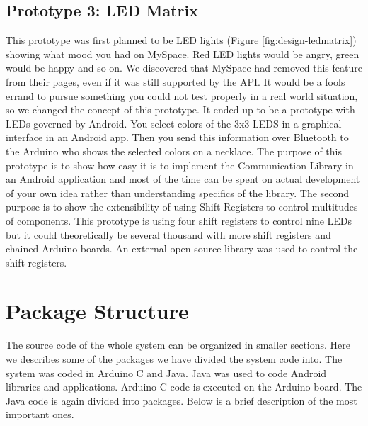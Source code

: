 \subsection{Prototype 3: LED Matrix} \label{section:prototype-led}
This prototype was first planned to be LED lights (Figure \ref{fig:design-ledmatrix}) showing what mood you had on MySpace.
Red LED lights would be angry, green would be happy and so on. We discovered that MySpace had removed this feature from their pages, even if it was still supported by the API. It would be a fools errand to pursue something you could not test properly
in a real world situation, so we changed the concept of this prototype. It ended up to be a prototype with LEDs governed by Android.
You select colors of the 3x3 LEDS in a graphical interface in an Android app. Then you send this information over Bluetooth
to the Arduino who shows the selected colors on a necklace.
The purpose of this prototype is to show how easy it is to implement the Communication Library in an Android application and most of the time can be spent on actual development of your own idea rather than understanding specifics of the library. The second purpose is to show the extensibility of using Shift Registers to control multitudes of components. This prototype is using four shift registers to control nine LEDs but it could theoretically be several thousand with more shift registers and chained Arduino boards. An external open-source library was used to control the shift registers. \cite{link:shiftpwm}

\section{Package Structure}
The source code of the whole system can be organized in smaller sections.
Here we describes some of the packages we have divided the system code into.
The system was coded in Arduino C and Java. Java was used to code Android libraries and applications.
Arduino C code is executed on the Arduino board. The Java code is again divided into packages.
Below is a brief description of the most important ones.

